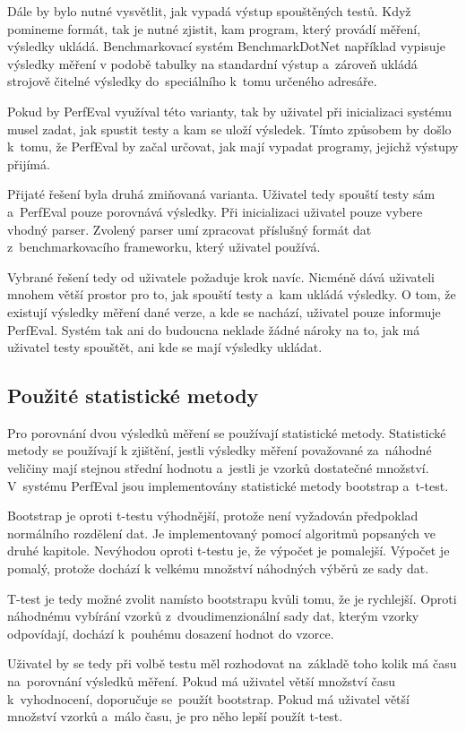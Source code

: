 Dále by bylo nutné vysvětlit, jak vypadá výstup spouštěných testů. Když pomineme formát, tak je nutné zjistit,
kam program, který provádí měření, výsledky ukládá. Benchmarkovací systém BenchmarkDotNet například vypisuje
výsledky měření v podobě tabulky na standardní výstup a~zároveň ukládá strojově čitelné výsledky do~speciálního
k~tomu určeného adresáře.

Pokud by PerfEval využíval této varianty, tak by uživatel při inicializaci systému musel zadat, jak spustit testy
a kam se uloží výsledek. Tímto způsobem by došlo k~tomu, že PerfEval by začal určovat, jak mají vypadat programy,
jejichž výstupy přijímá.

Přijaté řešení byla druhá zmiňovaná varianta. Uživatel tedy spouští testy sám a~PerfEval pouze porovnává výsledky.
Při inicializaci uživatel pouze vybere vhodný parser. Zvolený parser umí zpracovat příslušný formát dat z~benchmarkovacího frameworku,
který uživatel používá.

Vybrané řešení tedy od uživatele požaduje krok navíc. Nicméně dává uživateli mnohem větší prostor pro to, jak
spouští testy a~kam ukládá výsledky. O tom, že existují výsledky měření dané verze, a kde se nachází, uživatel
pouze informuje PerfEval. Systém tak ani do budoucna neklade žádné nároky na to, jak má uživatel testy spouštět,
ani kde se mají výsledky ukládat.

\subsection{Použité statistické metody}
Pro porovnání dvou výsledků měření se používají statistické metody. Statistické metody se používají k zjištění,
jestli výsledky měření považované za~náhodné veličiny mají stejnou střední hodnotu a~jestli je vzorků dostatečné množství.
V~systému PerfEval jsou implementovány statistické metody bootstrap a~t-test.

Bootstrap je oproti t-testu výhodnější, protože není vyžadován předpoklad normálního rozdělení dat.
Je implementovaný pomocí algoritmů popsaných ve druhé kapitole. Nevýhodou oproti t-testu je, že
výpočet je pomalejší. Výpočet je pomalý, protože dochází k velkému množství náhodných výběrů ze sady dat.

T-test je tedy možné zvolit namísto bootstrapu kvůli tomu, že je rychlejší. Oproti náhodnému vybírání vzorků z~dvoudimenzionální sady
dat, kterým vzorky odpovídají, dochází k~pouhému dosazení hodnot do vzorce.

Uživatel by se tedy při volbě testu měl rozhodovat na~základě toho kolik má času na~porovnání
výsledků měření. Pokud má uživatel větší množství času k~vyhodnocení, doporučuje se~použít bootstrap.
Pokud má uživatel větší množství vzorků a~málo času, je pro něho lepší použít t-test.


